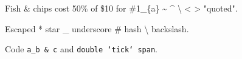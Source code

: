 Fish \& chips cost 50\% of \$10 for \#1\_\{a\} \textasciitilde{} \textasciicircum{} \textbackslash{} \textless{} \textgreater{} \textbar{} "quoted".

Escaped * star \_ underscore \# hash \textbackslash{} backslash.

Code \texttt{a\_b \& c} and \texttt{double `tick` span}.
